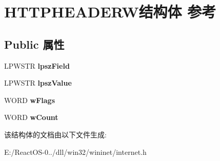 \hypertarget{struct_h_t_t_p_h_e_a_d_e_r_w}{}\section{H\+T\+T\+P\+H\+E\+A\+D\+E\+R\+W结构体 参考}
\label{struct_h_t_t_p_h_e_a_d_e_r_w}
\subsection*{Public 属性}
\begin{DoxyCompactItemize}
\item 
\mbox{\label{struct_h_t_t_p_h_e_a_d_e_r_w_a74cbfb69d555ef328d3af5962d50b717}} 
L\+P\+W\+S\+TR {\bfseries lpsz\+Field}
\item 
\mbox{\label{struct_h_t_t_p_h_e_a_d_e_r_w_a007fe2c8810bbe5fc1d9705d57e162e1}} 
L\+P\+W\+S\+TR {\bfseries lpsz\+Value}
\item 
\mbox{\label{struct_h_t_t_p_h_e_a_d_e_r_w_ad4dd76c58d28d84c1b8dcefabe8cf145}} 
W\+O\+RD {\bfseries w\+Flags}
\item 
\mbox{\label{struct_h_t_t_p_h_e_a_d_e_r_w_a5866c91d75f61b448dfb271db8ee4e0e}} 
W\+O\+RD {\bfseries w\+Count}
\end{DoxyCompactItemize}


该结构体的文档由以下文件生成\+:\begin{DoxyCompactItemize}
\item 
E\+:/\+React\+O\+S-\/0../dll/win32/wininet/internet.\+h\end{DoxyCompactItemize}
